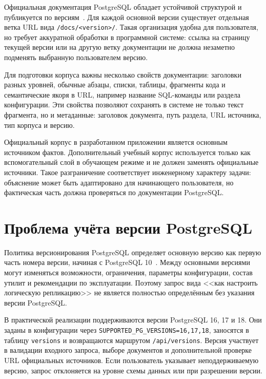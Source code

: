 Официальная документация PostgreSQL обладает устойчивой структурой и публикуется по версиям~\cite{postgres-docs,postgres-docs-16,postgres-docs-17,postgres-docs-18}. Для каждой основной версии существует отдельная ветка URL вида \texttt{/docs/<version>/}. Такая организация удобна для пользователя, но требует аккуратной обработки в программной системе: ссылка на страницу текущей версии или на другую ветку документации не должна незаметно подменять выбранную пользователем версию.

Для подготовки корпуса важны несколько свойств документации: заголовки разных уровней, обычные абзацы, списки, таблицы, фрагменты кода и семантические якоря в URL, например название SQL-команды или раздела конфигурации. Эти свойства позволяют сохранять в системе не только текст фрагмента, но и метаданные: заголовок документа, путь раздела, URL источника, тип корпуса и версию.

Официальный корпус в разработанном приложении является основным источником фактов. Дополнительный учебный корпус используется только как вспомогательный слой в обучающем режиме и не должен заменять официальные источники. Такое разграничение соответствует инженерному характеру задачи: объяснение может быть адаптировано для начинающего пользователя, но фактическая часть должна проверяться по документации PostgreSQL.

\section{Проблема учёта версии PostgreSQL}

Политика версионирования PostgreSQL определяет основную версию как первую часть номера версии, начиная с PostgreSQL 10~\cite{postgres-versioning}. Между основными версиями могут изменяться возможности, ограничения, параметры конфигурации, состав утилит и рекомендации по эксплуатации. Поэтому запрос вида <<как настроить логическую репликацию>> не является полностью определённым без указания версии PostgreSQL.

В практической реализации поддерживаются версии PostgreSQL 16, 17 и 18. Они заданы в конфигурации через \texttt{SUPPORTED\_PG\_VERSIONS=16,17,18}, заносятся в таблицу \texttt{versions} и возвращаются маршрутом \texttt{/api/versions}. Версия участвует в валидации входного запроса, выборе документов и дополнительной проверке URL официальных источников. Если пользователь указывает неподдерживаемую версию, запрос отклоняется на уровне схемы данных или при разрешении версии.

